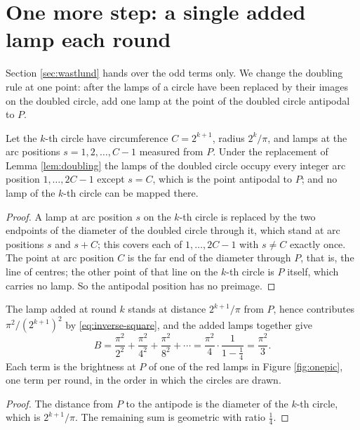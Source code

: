\section{One more step: a single added lamp each round}\label{sec:one-more-step}

Section \ref{sec:wastlund} hands over the odd terms only. We change the doubling rule at one
point: after the lamps of a circle have been replaced by their images on the doubled circle,
add one lamp at the point of the doubled circle antipodal to $P$.

\begin{lemma}\label{lem:missing}
Let the $k$-th circle have circumference $C=2^{k+1}$, radius $2^{k}/\pi$, and lamps at the
arc positions $s=1,2,\dots,C-1$ measured from $P$. Under the replacement of Lemma
\ref{lem:doubling} the lamps of the doubled circle occupy every integer arc position
$1,\dots,2C-1$ except $s=C$, which is the point antipodal to $P$; and no lamp of the
$k$-th circle can be mapped there.
\end{lemma}

\begin{proof}
A lamp at arc position $s$ on the $k$-th circle is replaced by the two endpoints of the
diameter of the doubled circle through it, which stand at arc positions $s$ and $s+C$; this
covers each of $1,\dots,2C-1$ with $s\ne C$ exactly once. The point at arc position $C$ is the
far end of the diameter through $P$, that is, the line of centres; the other point of that
line on the $k$-th circle is $P$ itself, which carries no lamp. So the antipodal position has
no preimage.
\end{proof}

\begin{proposition}\label{prop:added}
The lamp added at round $k$ stands at distance $2^{k+1}/\pi$ from $P$, hence contributes
$\pi^{2}/(2^{k+1})^{2}$ by \eqref{eq:inverse-square}, and the added lamps together give
\begin{equation}
  B=\frac{\pi^{2}}{2^{2}}+\frac{\pi^{2}}{4^{2}}+\frac{\pi^{2}}{8^{2}}+\cdots
   =\frac{\pi^{2}}{4}\cdot\frac{1}{1-\frac14}
   =\frac{\pi^{2}}{3}.
  \label{eq:supplement-brightness}
\end{equation}
Each term is the brightness at $P$ of one of the red lamps in Figure \ref{fig:onepic}, one term
per round, in the order in which the circles are drawn.
\end{proposition}

\begin{proof}
The distance from $P$ to the antipode is the diameter of the $k$-th circle, which is
$2^{k+1}/\pi$. The remaining sum is geometric with ratio $\frac14$.
\end{proof}

